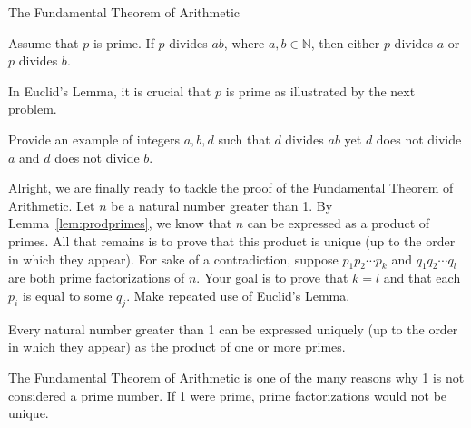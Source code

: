 \begin{section}{The Fundamental Theorem of Arithmetic}
\begin{theorem}\label{thm:Euclid}
Assume that $p$ is prime.  If $p$ divides $ab$, where $a,b\in\mathbb{N}$, then either $p$ divides $a$ or $p$ divides $b$.
\end{theorem}

In Euclid's Lemma, it is crucial that $p$ is prime as illustrated by the next problem.

\begin{problem}
Provide an example of integers $a, b, d$ such that $d$ divides $ab$ yet $d$ does not divide $a$ and $d$ does not divide $b$.
\end{problem}

Alright, we are finally ready to tackle the proof of the Fundamental Theorem of Arithmetic. Let $n$ be a natural number greater than 1. By Lemma~\ref{lem:prodprimes}, we know that $n$ can be expressed as a product of primes.  All that remains is to prove that this product is unique (up to the order in which they appear). For sake of a contradiction, suppose $p_1 p_2 \cdots p_k$ and $q_1 q_2 \cdots q_l$ are both prime factorizations of $n$.  Your goal is to prove that $k=l$ and that each $p_i$ is equal to some $q_j$. Make repeated use of Euclid's Lemma.

\begin{theorem}\label{thm:FTA}
Every natural number greater than 1 can be expressed uniquely (up to the order in which they appear) as the product of one or more primes.
\end{theorem}

The Fundamental Theorem of Arithmetic is one of the many reasons why 1 is not considered a prime number. If 1 were prime, prime factorizations would not be unique.

\end{section}